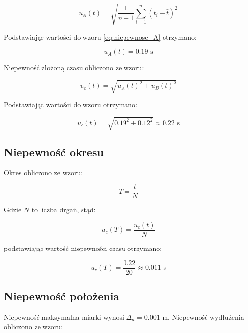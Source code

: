 \documentclass[a4paper,12pt]{article}
\begin{document}
\begin{equation} \label{eq:niepewnosc_A}
    u_A(t) = \sqrt{\frac{1}{n-1} \sum_{i=1}^{n} (t_i - \bar{t})^2}
\end{equation}

Podstawiając wartości do wzoru \ref{eq:niepewnosc_A} otrzymano:

\begin{equation*}
    u_A(t) = 0.19 \text{ s}
\end{equation*}

Niepewność złożoną czasu obliczono ze wzoru:

\begin{equation*}
    u_c(t) = \sqrt{u_A(t)^2 + u_B(t)^2}
\end{equation*}

Podstawiając wartości do wzoru otrzymano:

\begin{equation*}
    u_c(t) = \sqrt{0.19^2 + 0.12^2} \approx 0.22 \text{ s}
\end{equation*}





\subsection{Niepewność okresu}

Okres obliczono ze wzoru:

\begin{equation*}
    T = \frac{t}{N}
\end{equation*}

Gdzie $N$ to liczba drgań, stąd:

\begin{equation*}
    u_c(T) = \frac{u_c(t)}{N}
\end{equation*}

podstawiając wartość niepewności czasu otrzymano:

\begin{equation*}
    u_c(T) = \frac{0.22}{20} \approx 0.011 \text{ s}
\end{equation*}


\subsection{Niepewność położenia}

Niepewność maksymalna miarki wynosi $\Delta_d = 0.001$ m. Niepewność wydłużenia obliczono ze wzoru:
\end{document}
